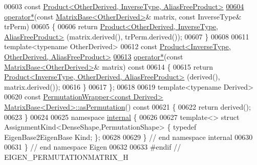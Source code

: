 \begin{DoxyCode}
00603     \textcolor{keyword}{const} \hyperlink{group___core___module_class_eigen_1_1_product}{Product<OtherDerived, InverseType, AliasFreeProduct>}
\hyperlink{class_eigen_1_1_inverse_impl_3_01_permutation_type_00_01_permutation_storage_01_4_a1d5a5cf25a5052d1b8181587375c853b}{00604}     \hyperlink{class_eigen_1_1_inverse_impl_3_01_permutation_type_00_01_permutation_storage_01_4_a1d5a5cf25a5052d1b8181587375c853b}{operator*}(\textcolor{keyword}{const} \hyperlink{group___core___module_class_eigen_1_1_matrix_base}{MatrixBase<OtherDerived>}& matrix, \textcolor{keyword}{const} InverseType& 
      trPerm)
00605     \{
00606       \textcolor{keywordflow}{return} \hyperlink{group___core___module_class_eigen_1_1_product}{Product<OtherDerived, InverseType, AliasFreeProduct>}
      (matrix.derived(), trPerm.derived());
00607     \}
00608 
00611     \textcolor{keyword}{template}<\textcolor{keyword}{typename} OtherDerived>
00612     \textcolor{keyword}{const} \hyperlink{group___core___module_class_eigen_1_1_product}{Product<InverseType, OtherDerived, AliasFreeProduct>}
\hyperlink{class_eigen_1_1_inverse_impl_3_01_permutation_type_00_01_permutation_storage_01_4_abf863c3bf5bde58cead077f335bfff3a}{00613}     \hyperlink{class_eigen_1_1_inverse_impl_3_01_permutation_type_00_01_permutation_storage_01_4_abf863c3bf5bde58cead077f335bfff3a}{operator*}(\textcolor{keyword}{const} \hyperlink{group___core___module_class_eigen_1_1_matrix_base}{MatrixBase<OtherDerived>}& matrix)\textcolor{keyword}{ const}
00614 \textcolor{keyword}{    }\{
00615       \textcolor{keywordflow}{return} \hyperlink{group___core___module_class_eigen_1_1_product}{Product<InverseType, OtherDerived, AliasFreeProduct>}
      (derived(), matrix.derived());
00616     \}
00617 \};
00618 
00619 \textcolor{keyword}{template}<\textcolor{keyword}{typename} Derived>
00620 \textcolor{keyword}{const} \hyperlink{group___core___module_class_eigen_1_1_permutation_wrapper}{PermutationWrapper<const Derived>} 
      \hyperlink{group___core___module_class_eigen_1_1_matrix_base}{MatrixBase<Derived>::asPermutation}()\textcolor{keyword}{ const}
00621 \textcolor{keyword}{}\{
00622   \textcolor{keywordflow}{return} derived();
00623 \}
00624 
00625 \textcolor{keyword}{namespace }\hyperlink{namespaceinternal}{internal} \{
00626 
00627 \textcolor{keyword}{template}<> \textcolor{keyword}{struct }AssignmentKind<DenseShape,PermutationShape> \{ \textcolor{keyword}{typedef} EigenBase2EigenBase Kind; \};
00628 
00629 \} \textcolor{comment}{// end namespace internal}
00630 
00631 \} \textcolor{comment}{// end namespace Eigen}
00632 
00633 \textcolor{preprocessor}{#endif // EIGEN\_PERMUTATIONMATRIX\_H}
\end{DoxyCode}
